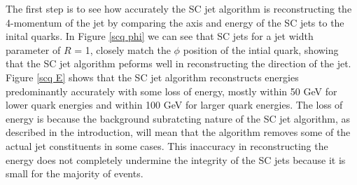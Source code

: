 \documentclass[a4paper,11pt, onecolumn]{article}
\begin{document}
  The first step is to see how accurately the SC jet algorithm is reconstructing the 4-momentum of the jet by comparing the axis and energy of the 
  SC jets to the inital quarks.
  In Figure \ref{scq phi} we can see that SC jets for a jet width parameter of $R$ = 1, closely match the $\phi$ position of the intial quark, 
  showing that the SC jet algorithm peforms well in reconstructing the direction of the jet.
  Figure \ref{scq E} shows that the SC jet algorithm reconstructs energies predominantly accurately 
  with some loss of energy, mostly within 50 GeV for lower quark energies and within 100 GeV for larger quark energies. The loss of energy is because the background subratcting 
  nature of the SC jet algorithm, as described in the introduction, will mean that the algorithm removes some of the actual jet constituents in some cases. This inaccuracy in 
  reconstructing the energy does not completely undermine the integrity of the SC jets because it is small for the majority of events.\\
\end{document}
